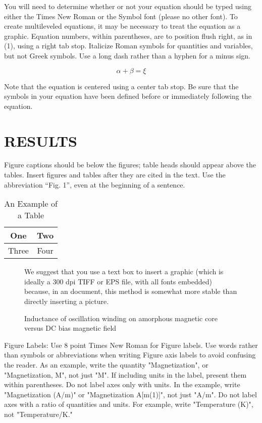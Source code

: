 \documentclass[letterpaper, 10 pt, conference]{ieeeconf}  %
\begin{document}
You will need to determine whether or not your equation should be typed using either the Times New Roman or the Symbol font (please no other font). To create multileveled equations, it may be necessary to treat the equation as a graphic. Equation numbers, within parentheses, are to position flush right, as in (1), using a right tab stop. Italicize Roman symbols for quantities and variables, but not Greek symbols. Use a long dash rather than a hyphen for a minus sign.

$$
\alpha + \beta = \xi
$$

Note that the equation is centered using a center tab stop. Be sure that the symbols in your equation have been defined before or immediately following the equation.

\section{RESULTS}

Figure captions should be below the figures; table heads should appear above the tables. Insert figures and tables after they are cited in the text. Use the abbreviation “Fig. 1”, even at the beginning of a sentence.

\begin{table}[h]
\caption{An Example of a Table}
\label{table_example}
\begin{center}
\begin{tabular}{|c||c|}
\hline
One & Two\\
\hline
Three & Four\\
\hline
\end{tabular}
\end{center}
\end{table}
\vspace*{-\baselineskip}

   \begin{figure}[thpb]
      \centering
      {\parbox{3in}{We suggest that you use a text box to insert a graphic (which is ideally a 300 dpi TIFF or EPS file, with all fonts embedded) because, in an document, this method is somewhat more stable than directly inserting a picture.
}}
      \caption{Inductance of oscillation winding on amorphous
       magnetic core versus DC bias magnetic field}
      \label{figurelabel}
   \end{figure}
   

Figure Labels: Use 8 point Times New Roman for Figure labels. Use words rather than symbols or abbreviations when writing Figure axis labels to avoid confusing the reader. As an example, write the quantity "Magnetization", or "Magnetization, M", not just "M". If including units in the label, present them within parentheses. Do not label axes only with units. In the example, write "Magnetization (A/m)" or "Magnetization {A[m(1)]}", not just "A/m". Do not label axes with a ratio of quantities and units. For example, write "Temperature (K)", not "Temperature/K."
\end{document}
